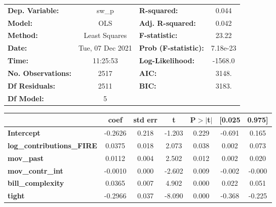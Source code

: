 \begin{center}
\begin{tabular}{lclc}
\toprule
\textbf{Dep. Variable:}           &      sw\_p       & \textbf{  R-squared:         } &     0.044   \\
\textbf{Model:}                   &       OLS        & \textbf{  Adj. R-squared:    } &     0.042   \\
\textbf{Method:}                  &  Least Squares   & \textbf{  F-statistic:       } &     23.22   \\
\textbf{Date:}                    & Tue, 07 Dec 2021 & \textbf{  Prob (F-statistic):} &  7.18e-23   \\
\textbf{Time:}                    &     11:25:53     & \textbf{  Log-Likelihood:    } &   -1568.0   \\
\textbf{No. Observations:}        &        2517      & \textbf{  AIC:               } &     3148.   \\
\textbf{Df Residuals:}            &        2511      & \textbf{  BIC:               } &     3183.   \\
\textbf{Df Model:}                &           5      & \textbf{                     } &             \\
\bottomrule
\end{tabular}
\begin{tabular}{lcccccc}
                                  & \textbf{coef} & \textbf{std err} & \textbf{t} & \textbf{P$> |$t$|$} & \textbf{[0.025} & \textbf{0.975]}  \\
\midrule
\textbf{Intercept}                &      -0.2626  &        0.218     &    -1.203  &         0.229        &       -0.691    &        0.165     \\
\textbf{log\_contributions\_FIRE} &       0.0375  &        0.018     &     2.073  &         0.038        &        0.002    &        0.073     \\
\textbf{mov\_past}                &       0.0112  &        0.004     &     2.502  &         0.012        &        0.002    &        0.020     \\
\textbf{mov\_contr\_int}          &      -0.0010  &        0.000     &    -2.602  &         0.009        &       -0.002    &       -0.000     \\
\textbf{bill\_complexity}         &       0.0365  &        0.007     &     4.902  &         0.000        &        0.022    &        0.051     \\
\textbf{tight}                    &      -0.2966  &        0.037     &    -8.090  &         0.000        &       -0.368    &       -0.225     \\

\end{tabular}
\end{center}
